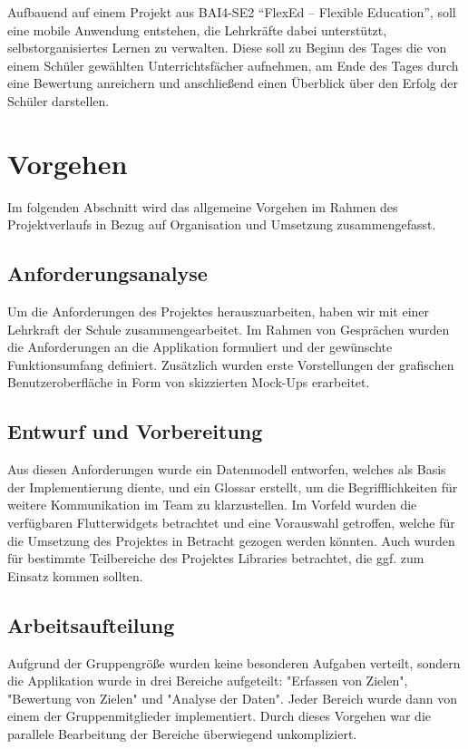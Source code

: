 \documentclass[
  a4paper,
  DIV=10,
  oneside,
  BCOR=5mm,
  parskip=half,
  numbers=noenddot
]{scrreprt}
\begin{document}
Aufbauend auf einem Projekt aus BAI4-SE2 ``FlexEd – Flexible Education'', soll eine mobile Anwendung entstehen, die Lehrkräfte dabei unterstützt, selbstorganisiertes Lernen zu verwalten. Diese soll zu Beginn des Tages die von einem Schüler gewählten Unterrichtsfächer aufnehmen, am Ende des Tages durch eine Bewertung anreichern und anschließend einen Überblick über den Erfolg der Schüler darstellen.

\chapter{Vorgehen}
Im folgenden Abschnitt wird das allgemeine Vorgehen im Rahmen des Projektverlaufs in Bezug auf Organisation und Umsetzung zusammengefasst.

\section{Anforderungsanalyse}
Um die Anforderungen des Projektes herauszuarbeiten, haben wir mit einer Lehrkraft der Schule zusammengearbeitet. Im Rahmen von Gesprächen wurden die Anforderungen an die Applikation formuliert und der gewünschte Funktionsumfang definiert. Zusätzlich wurden erste Vorstellungen der grafischen Benutzeroberfläche in Form von skizzierten Mock-Ups erarbeitet.

\section{Entwurf und Vorbereitung}
Aus diesen Anforderungen wurde ein Datenmodell entworfen, welches als Basis der Implementierung diente, und ein Glossar erstellt, um die Begrifflichkeiten für weitere Kommunikation im Team zu klarzustellen. Im Vorfeld wurden die verfügbaren Flutterwidgets betrachtet und eine Vorauswahl getroffen, welche für die Umsetzung des Projektes in Betracht gezogen werden könnten. Auch wurden für bestimmte Teilbereiche des Projektes Libraries betrachtet, die ggf. zum Einsatz kommen sollten.

\section{Arbeitsaufteilung}
Aufgrund der Gruppengröße wurden keine besonderen Aufgaben verteilt, sondern die Applikation wurde in drei Bereiche aufgeteilt: "Erfassen von Zielen", "Bewertung von Zielen" und "Analyse der Daten". Jeder Bereich wurde dann von einem der Gruppenmitglieder implementiert. Durch dieses Vorgehen war die parallele Bearbeitung der Bereiche überwiegend unkompliziert. 
\end{document}
